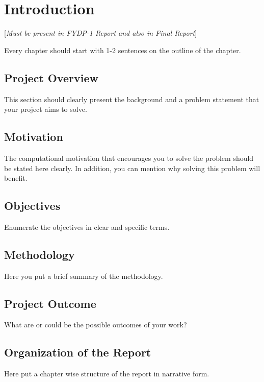 \chapter{Introduction}
[\textit{Must be present in FYDP-1 Report and also in Final Report}]


Every chapter should start with 1-2 sentences on the outline of the chapter.

\section{Project Overview}
This section should clearly present the background and a problem statement that your project aims to solve.
\section{Motivation}
The computational motivation that encourages you to solve the problem should be stated here clearly. In addition, you can mention why solving this problem will benefit.
\section{Objectives}
Enumerate the objectives in clear and specific terms.
\section{Methodology}
Here you put a brief summary of the methodology.
\section{Project Outcome}
What are or could be the possible outcomes of your work?
\section{Organization of the Report}
Here put a chapter wise structure of the report in narrative form.
